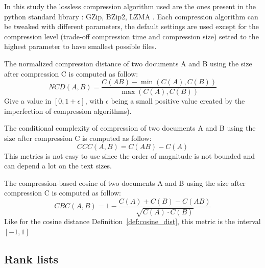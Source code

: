In this study the lossless compression algorithm used are the ones present in the python standard library : GZip, BZip2, LZMA \cite{python_compression}.
Each compression algorithm can be tweaked with different parameters, the default settings are used except for the compression level (trade-off compression time and compression size) setted to the highest parameter to have smallest possible files.

\begin{definition}
  The normalized compression distance of two documents A and B using the size after compression C is computed as follow:
  \begin{equation}
    NCD(A, B) = \frac{C(AB) - \min(C(A), C(B))}{\max(C(A), C(B))}
  \end{equation}
  Give a value in $\left[0, 1+\epsilon\right]$, with $\epsilon$ being a small positive value created by the imperfection of compression algorithms).
\end{definition}

\begin{definition}
  The conditional complexity of compression of two documents A and B using the size after compression C is computed as follow:
  \begin{equation}
    CCC(A, B) = C(AB) - C(A)
  \end{equation}
  This metrics is not easy to use since the order of magnitude is not bounded and can depend a lot on the text sizes.
\end{definition}

\begin{definition}
  The compression-based cosine of two documents A and B using the size after compression C is computed as follow:
  \begin{equation}
    CBC(A, B) = 1 - \frac{C(A) + C(B) - C(AB)}{\sqrt{C(A) \cdot C(B)}}
  \end{equation}
  Like for the cosine distance Definition~\ref{def:cosine_dist}, this metric is the interval $\left[-1, 1 \right]$
\end{definition}

\subsection{Rank lists}

